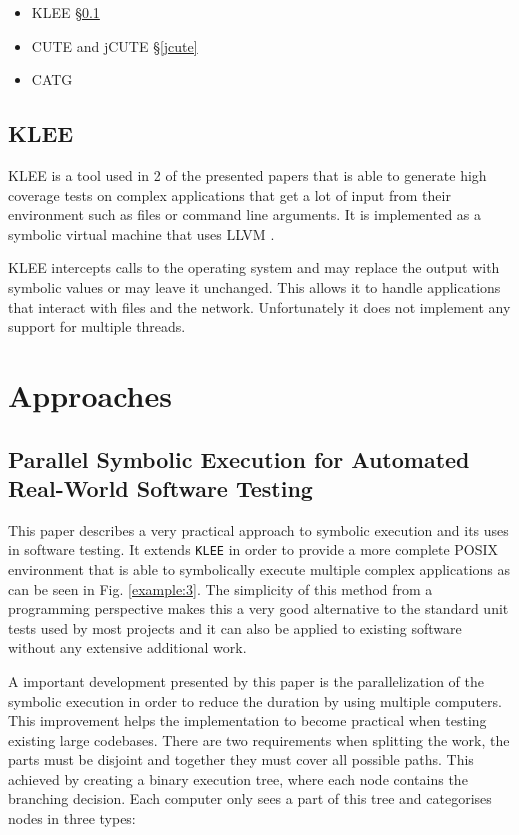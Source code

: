 \documentclass[10pt]{llncs}
\begin{document}
\begin{itemize}
	\item KLEE \cite{klee} §\ref{klee}
	\item CUTE and jCUTE \cite{base4} §\ref{jcute}
	\item CATG  \cite{catg}
\end{itemize}

\subsection{KLEE}
\label{klee}

KLEE \cite{klee} is a tool used in 2 of the presented papers that is able to generate high coverage tests on complex applications that get a lot of input from their environment such as files or command line arguments. It is implemented as a symbolic virtual machine that uses LLVM \cite{llvm}.

KLEE intercepts calls to the operating system and may replace the output with symbolic values or may leave it unchanged. This allows it to handle applications that interact with files and the network. Unfortunately it does not implement any support for multiple threads. 

\section{Approaches}
\label{approaches}

\subsection{Parallel Symbolic Execution for Automated Real-World Software Testing \cite{base3}}
\label{approach1}

This paper describes a very practical approach to symbolic execution and its uses in software testing. It extends \texttt{KLEE} \cite{klee} in order to provide a more complete POSIX environment that is able to symbolically execute multiple complex applications as can be seen in Fig. \ref{example:3}. The simplicity of this method from a programming perspective makes this a very good alternative to the standard unit tests used by most projects and it can also be applied to existing software without any extensive additional work.

A important development presented by this paper is the parallelization of the symbolic execution in order to reduce the duration by using multiple computers. This improvement helps the implementation to become practical when testing existing large codebases. There are two requirements when splitting the work, the parts must be disjoint and together they must cover all possible paths. This achieved by creating a binary execution tree, where each node contains the branching decision. Each computer only sees a part of this tree and categorises nodes in three types:
\end{document}
